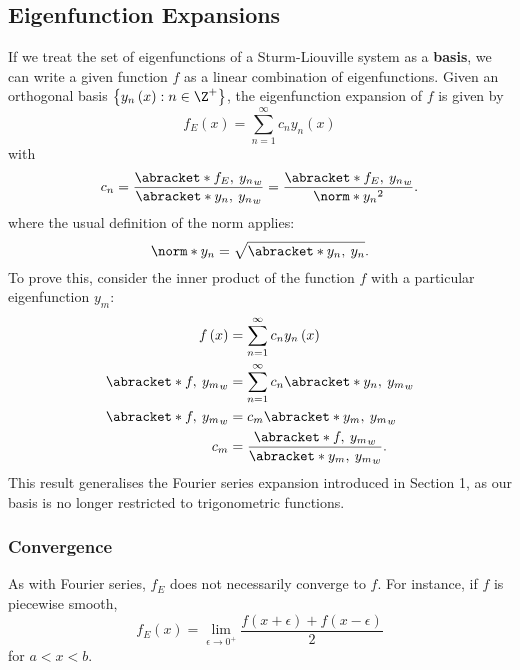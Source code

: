 \documentclass{article}
\begin{document}
\subsection{Eigenfunction Expansions}
If we treat the set of eigenfunctions of a Sturm-Liouville system as a
\textbf{basis}, we can write a given function \(f\) as a linear
combination of eigenfunctions. Given an orthogonal basis \(\left\{
y_n\left( x \right) : n \in \Z^{+} \right\}\), the eigenfunction
expansion of \(f\) is given by
\begin{equation*}
    f_E\left( x \right) = \sum_{n = 1}^\infty c_n y_n\left( x \right)
\end{equation*}
with
\begin{equation*}
    c_n = \frac{\abracket*{f_E,\: y_n}_w}{\abracket*{y_n,\: y_n}_w} = \frac{\abracket*{f_E,\: y_n}_w}{\norm*{y_n}^2}.
\end{equation*}
where the usual definition of the norm applies:
\begin{equation*}
    \norm*{y_n} = \sqrt{\abracket*{y_n,\: y_n}}.
\end{equation*}
To prove this, consider the inner product of the function \(f\) with
a particular eigenfunction \(y_m\):
\begin{align*}
    f\left( x \right)      & = \sum_{n = 1}^\infty c_n y_n\left( x \right)              \\
    \abracket*{f,\: y_m}_w & = \sum_{n = 1}^\infty c_n \abracket*{y_n,\: y_m}_w         \\
    \abracket*{f,\: y_m}_w & = c_m \abracket*{y_m,\: y_m}_w                             \\
    c_m                    & = \frac{\abracket*{f,\: y_m}_w}{\abracket*{y_m,\: y_m}_w}.
\end{align*}
This result generalises the Fourier series expansion introduced in Section 1, as our basis
is no longer restricted to trigonometric functions.
\subsubsection{Convergence}
As with Fourier series, \(f_E\) does not necessarily converge to \(f\).
For instance, if \(f\) is piecewise smooth,
\begin{equation*}
    f_E\left( x \right) = \lim_{\epsilon \to 0^+} \frac{f\left( x + \epsilon \right) + f\left( x - \epsilon \right)}{2}
\end{equation*}
for \(a < x < b\).
\end{document}
